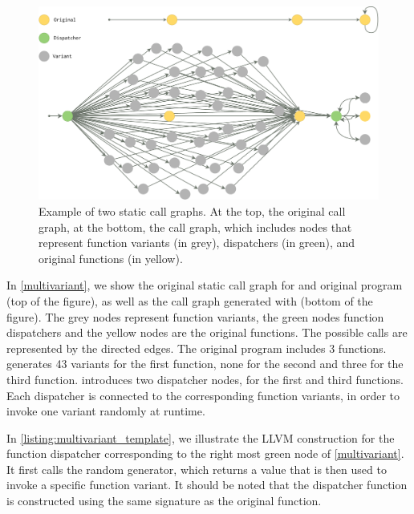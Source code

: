\begin{figure}
    \centering
  \includegraphics[width=.8\linewidth]{diagrams/CFG.pdf}
  \caption{Example of two static call graphs. At the top, the original call graph, at the bottom, the call graph, which includes nodes that represent function variants (in grey), dispatchers (in green), and original functions  (in yellow).
}
  \label{multivariant}
\end{figure}

In \autoref{multivariant}, we show the original static call graph for and original program (top of the figure), as well as the call graph generated with \tool (bottom of the figure).
The grey nodes represent function variants, the green nodes function dispatchers and the yellow nodes are the original functions.
The possible calls are represented by the directed edges.
The original program includes 3 functions. \tool generates 43 variants for the first function, none for the second and three for the third function. 
\tool introduces two dispatcher nodes, for the first and third functions. Each dispatcher is connected to the corresponding function variants, in order to invoke one variant randomly at runtime.


In  \autoref{listing:multivariant_template}, we illustrate the LLVM construction for the function dispatcher corresponding to the right most green node of \autoref{multivariant}.
It first calls the random generator, which returns a value that is then used to invoke a specific function variant. It should be noted that the dispatcher function is constructed using the same signature as the original function. 


\lstset{
    language=llvm,
    basicstyle=\footnotesize\ttfamily,
    columns=fullflexible,
    breaklines=true,
    numbers=none,
    stepnumber=1,
    float
}

